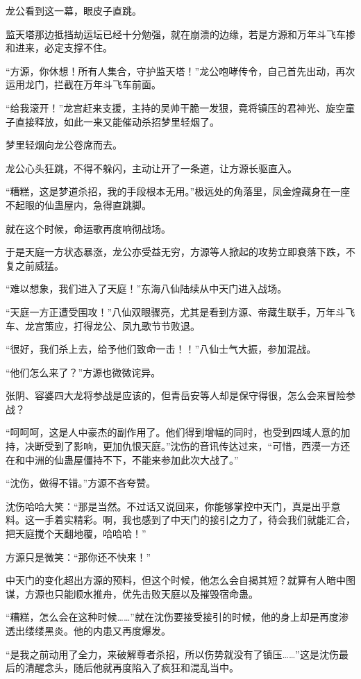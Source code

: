 \begin{this_body}
龙公看到这一幕，眼皮子直跳。

监天塔那边抵挡劫运坛已经十分勉强，就在崩溃的边缘，若是方源和万年斗飞车掺和进来，必定支撑不住。

“方源，你休想！所有人集合，守护监天塔！”龙公咆哮传令，自己首先出动，再次运用龙门，拦截在万年斗飞车前面。

“给我滚开！”龙宫赶来支援，主持的吴帅干脆一发狠，竟将镇压的君神光、旋空童子直接释放，如此一来又能催动杀招梦里轻烟了。

梦里轻烟向龙公卷席而去。

龙公心头狂跳，不得不躲闪，主动让开了一条道，让方源长驱直入。

“糟糕，这是梦道杀招，我的手段根本无用。”极远处的角落里，凤金煌藏身在一座不起眼的仙蛊屋内，急得直跳脚。

就在这个时候，命运歌再度响彻战场。

于是天庭一方状态暴涨，龙公亦受益无穷，方源等人掀起的攻势立即衰落下跌，不复之前威猛。

“难以想象，我们进入了天庭！”东海八仙陆续从中天门进入战场。

“天庭一方正遭受围攻！”八仙双眼骤亮，尤其是看到方源、帝藏生联手，万年斗飞车、龙宫策应，打得龙公、凤九歌节节败退。

“很好，我们杀上去，给予他们致命一击！！”八仙士气大振，参加混战。

“他们怎么来了？”方源也微微诧异。

张阴、容婆四大龙将参战是应该的，但青岳安等人却是保守得很，怎么会来冒险参战？

“呵呵呵，这是人中豪杰的副作用了。他们得到增幅的同时，也受到四域人意的加持，决断受到了影响，更加仇恨天庭。”沈伤的音讯传达过来，“可惜，西漠一方还在和中洲的仙蛊屋僵持不下，不能来参加此次大战了。”

“沈伤，做得不错。”方源不吝夸赞。

沈伤哈哈大笑：“那是当然。不过话又说回来，你能够掌控中天门，真是出乎意料。这一手着实精彩。啊，我也感到了中天门的接引之力了，待会我们就能汇合，把天庭搅个天翻地覆，哈哈哈！”

方源只是微笑：“那你还不快来！”

中天门的变化超出方源的预料，但这个时候，他怎么会自揭其短？就算有人暗中图谋，方源也只能顺水推舟，优先击败天庭以及摧毁宿命蛊。

“糟糕，怎么会在这种时候……”就在沈伤要接受接引的时候，他的身上却是再度渗透出缕缕黑炎。他的内患又再度爆发。

“是我之前动用了全力，来破解尊者杀招，所以伤势就没有了镇压……”这是沈伤最后的清醒念头，随后他就再度陷入了疯狂和混乱当中。


\end{this_body}
